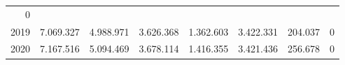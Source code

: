\begin{tabular}{llllllll}
  \multicolumn{1}{r}{0} \\
\multicolumn{1}{l}{\hspace{1em}2019} &
  \multicolumn{1}{|r}{7.069.327} &
  \multicolumn{1}{r}{4.988.971} &
  \multicolumn{1}{r}{3.626.368} &
  \multicolumn{1}{r}{1.362.603} &
  \multicolumn{1}{r}{3.422.331} &
  \multicolumn{1}{r}{204.037} &
  \multicolumn{1}{r}{0} \\
\multicolumn{1}{l}{\hspace{1em}2020} &
  \multicolumn{1}{|r}{7.167.516} &
  \multicolumn{1}{r}{5.094.469} &
  \multicolumn{1}{r}{3.678.114} &
  \multicolumn{1}{r}{1.416.355} &
  \multicolumn{1}{r}{3.421.436} &
  \multicolumn{1}{r}{256.678} &
  \multicolumn{1}{r}{0} \\
\cline{1-8}
\end{tabular}
